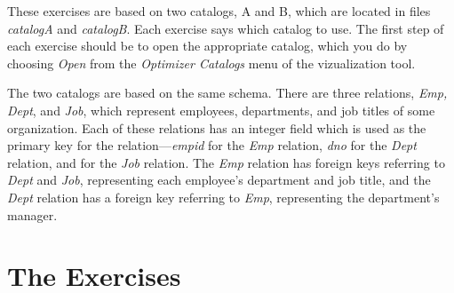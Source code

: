 These exercises are based on two catalogs, A and B, which are located in files
{\em catalogA} and {\em catalogB}.  Each exercise says which catalog to use.  
The first
step of each exercise should be to open the appropriate catalog, which you do
by choosing {\em Open} from the {\em Optimizer Catalogs} menu of the 
vizualization tool.


The two catalogs are based on the same schema.  There are three
relations, {\em Emp, Dept}, and {\em Job}, which represent employees,
departments, and job titles of some organization.  Each of these
relations has an integer field which is used as the primary key for
the relation---{\em empid} for the {\em Emp} relation, {\em dno} for
the {\em Dept} relation, and {\jno} for the {\em Job} relation.  The
{\em Emp} relation has foreign keys referring to {\em Dept} and {\em
Job}, representing each employee's department and job title, and the
{\em Dept} relation has a foreign key referring to {\em Emp},
representing the department's manager.

\section{The Exercises}

